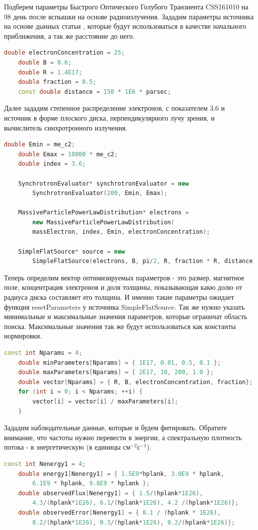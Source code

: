Подберем параметры Быстрого Оптического Голубого Транзиента CSS161010 на 98 день после вспышки на основе радиоизлучения. Зададим параметры источника на основе дынных статьи \cite{Coppejans2020}, которые будут использоваться в качестве начального приближения, а так же расстояние до него.
\begin{lstlisting}[language=c++]
    double electronConcentration = 25;
    double B = 0.6;
    double R = 1.4E17;
    double fraction = 0.5;
    const double distance = 150 * 1E6 * parsec;
\end{lstlisting}
Далее зададим степенное распределение электронов, с показателем 3.6 и источник в форме плоского диска, перпендикулярного лучу зрения, и вычислитель синхротронного излучения.
\begin{lstlisting}[language=c++]
    double Emin = me_c2;
    double Emax = 10000 * me_c2;
    double index = 3.6;
	
    SynchrotronEvaluator* synchrotronEvaluator = new
        SynchrotronEvaluator(200, Emin, Emax);

    MassiveParticlePowerLawDistribution* electrons = 
        new MassiveParticlePowerLawDistribution(
        massElectron, index, Emin, electronConcentration);

    SimpleFlatSource* source = new
        SimpleFlatSource(electrons, B, pi/2, R, fraction * R, distance);
\end{lstlisting}
Теперь определим вектор оптимизируемых параметров - это размер, магнитное поле, концентрация электронов и доля толщины, показывающая какю долю от радиуса диска составляет его толщина. И именно такие параметры ожидает функция resetParameters у источника SimpleFlatSource. Так же нужно указать минимальные и максимальные значения параметров, которые ограничат область поиска. Максимальные значения так же будут использоваться как константы нормировки.
\begin{lstlisting}[language=c++]
    const int Nparams = 4;
    double minParameters[Nparams] = { 1E17, 0.01, 0.5, 0.1 };
    double maxParameters[Nparams] = { 2E17, 10, 200, 1.0 };
    double vector[Nparams] = { R, B, electronConcentration, fraction};
    for (int i = 0; i < Nparams; ++i) {
	    vector[i] = vector[i] / maxParameters[i];
    }
\end{lstlisting}
Зададим наблюдательные данные, которые и будем фитировать. Обратите внимание, что частоты нужно перевести в энергии, а спектральную плотность потока - в энергетическую (в единицы $\text{см}^{-2}\text{с}^{-1}$).
\begin{lstlisting}[language=c++]
    const int Nenergy1 = 4;
    double energy1[Nenergy1] = { 1.5E9*hplank, 3.0E9 * hplank, 
    	6.1E9 * hplank, 9.8E9 * hplank };
    double observedFlux[Nenergy1] = { 1.5/(hplank*1E26), 
    	4.3/(hplank*1E26), 6.1/(hplank*1E26), 4.2 /(hplank*1E26)};
    double observedError[Nenergy1] = { 0.1 / (hplank * 1E26), 
    	0.2/(hplank*1E26), 0.3/(hplank*1E26), 0.2/(hplank*1E26)};
\end{lstlisting}
